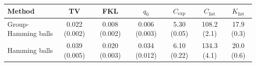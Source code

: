\begin{tabular}{lcccccc}
\toprule
Method & TV & FKL & $q_0$ & $C_{\mathrm{exp}}$ & $C_{\mathrm{list}}$ & $K_{\mathrm{list}}$ \\
\midrule
Group-Hamming balls & 0.022 (0.002) & 0.008 (0.002) & 0.006 (0.003) & 5.30 (0.05) & 108.2 (2.1) & 17.9 (0.3) \\
Hamming balls & 0.039 (0.005) & 0.020 (0.003) & 0.034 (0.012) & 6.10 (0.22) & 134.3 (4.1) & 20.0 (0.6) \\
\bottomrule
\end{tabular}
